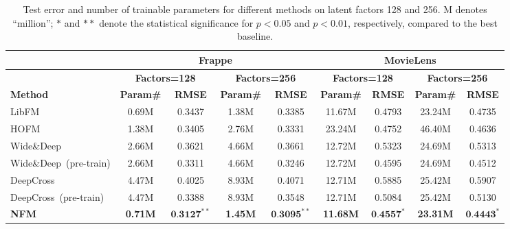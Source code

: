 \begin{table*}[t]
	\small
	\begin{center}
		\caption{Test error and number of trainable parameters for different methods on latent factors 128 and 256. M denotes ``million''; $*$ and $**$ denote the statistical significance for $p<0.05$ and $p<0.01$, respectively, compared to the best baseline. }
		\vspace{-10pt}
		\label{tab:performance}
		\begin{tabular}{| l | c | c | c | c | c | c | c | c |} \hline
			& \multicolumn{4}{c|}{\textbf{Frappe}} & \multicolumn{4}{c|}{\textbf{MovieLens}} \\ \hline 
			& \multicolumn{2}{c|}{\textbf{Factors=128}} & \multicolumn{2}{c|}{\textbf{Factors=256}} & \multicolumn{2}{c|}{\textbf{Factors=128}} & \multicolumn{2}{c|}{\textbf{Factors=256}}\\ \hline 
			\textbf{Method} & \textbf{Param\#} & \textbf{RMSE} & \textbf{Param\#} & \textbf{RMSE} & \textbf{Param\#} & \textbf{RMSE} & \textbf{Param\#} & \textbf{RMSE} \\ \hline\hline
			LibFM~\cite{libFM} 	& 0.69M  & 0.3437 & 1.38M  & 0.3385 & 11.67M  & 0.4793 & 23.24M  & 0.4735 \\ \hline
			HOFM & 1.38M  & 0.3405 & 2.76M & 0.3331 & 23.24M & 0.4752
			& 46.40M & 0.4636 \\ \hline\hline
			Wide\&Deep~\cite{WideDeep} &  2.66M  & 0.3621 & 4.66M & 0.3661 & 12.72M & 0.5323 & 24.69M  & 0.5313 \\ \hline
			Wide\&Deep~(pre-train) &  2.66M  & 0.3311 & 4.66M & 0.3246  & 12.72M & 0.4595 & 24.69M  & 0.4512 \\ \hline \hline
			DeepCross~\cite{DeepCross}	& 4.47M  & 0.4025 & 8.93M & 0.4071  & 12.71M & 0.5885 & 25.42M  & 0.5907 \\ \hline
			DeepCross~(pre-train)	& 4.47M  & 0.3388 & 8.93M & 0.3548  & 12.71M & 0.5084 & 25.42M  & 0.5130  \\ \hline \hline
			\textbf{NFM} & \textbf{0.71M} & $\textbf{0.3127}^{**}$ & \textbf{1.45M}  & $\textbf{0.3095}^{**}$ & \textbf{11.68M} & $\textbf{0.4557}^*$ & \textbf{23.31M}  & $\textbf{0.4443}^*$\\ \hline
		\end{tabular}
	\end{center}
	\vspace{-8pt}
\end{table*}

